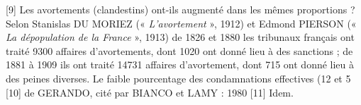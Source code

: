 [9] Les avortements (clandestins) ont-ils augmenté dans les mêmes proportions ? Selon Stanislas DU MORIEZ (« \emph{L'avortement} », 1912) et Edmond PIERSON (« \emph{La dépopulation de la France} », 1913) de 1826 et 1880 les tribunaux français ont traité 9300 affaires d'avortements, dont 1020 ont donné lieu à des sanctions ; de 1881 à 1909 ils ont traité 14731 affaires d'avortement, dont 715 ont donné lieu à des peines diverses. Le faible pourcentage des condamnations effectives (12 et 5%
[10] de GERANDO, cité par BIANCO et LAMY : 1980
[11] Idem.